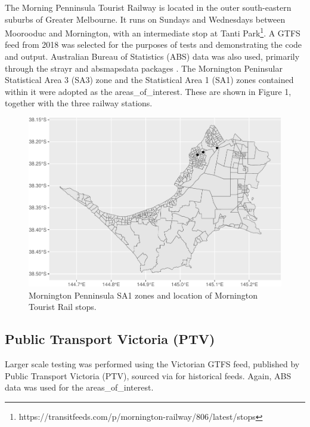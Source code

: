\documentclass[preprint, 3p,
authoryear]{elsarticle} %
\begin{document}
The Morning Penninsula Tourist Railway is located in the outer
south-eastern suburbs of Greater Melbourne. It runs on Sundays and
Wednesdays between Moorooduc and Mornington, with an intermediate stop
at Tanti Park\footnote{https://transitfeeds.com/p/mornington-railway/806/latest/stops}.
A GTFS feed from 2018 was selected for the purposes of tests and
demonstrating the code and output. Australian Bureau of Statistics (ABS)
data was also used, primarily through the strayr and absmapsdata
packages \citep{r-strayr}. The Mornington Peninsular Statistical Area 3
(SA3) zone and the Statistical Area 1 (SA1) zones contained within it
were adopted as the areas\_of\_interest. These are shown in Figure 1,
together with the three railway stations.

\begin{figure}
\centering
\includegraphics{Leveraging_GTFS_to_assess_transit_supply_Transport_Geography_files/figure-latex/mornington_map-1.pdf}
\caption{Mornington Penninsula SA1 zones and location of Mornington
Tourist Rail stops.}
\end{figure}

\hypertarget{public-transport-victoria-ptv}{%
\subsection{Public Transport Victoria
(PTV)}\label{public-transport-victoria-ptv}}

Larger scale testing was performed using the Victorian GTFS feed,
published by Public Transport Victoria (PTV), sourced via
\citet{transitfeeds_victoria:2023aa} for historical feeds. Again, ABS
data was used for the areas\_of\_interest.
\end{document}
